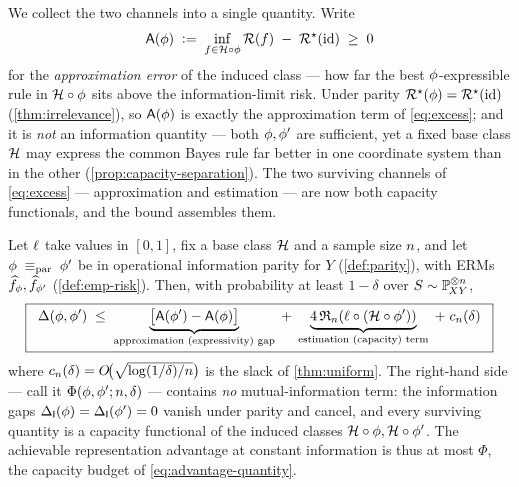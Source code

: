 We collect the two channels into a single quantity. Write
\begin{equation}
  \label{eq:approxerr}
  \mathsf{A}(\phi) \;\vcentcolon=\; \inf_{f\in\mathcal{H}\circ\phi}\mathcal{R}(f)
    \;-\; \mathcal{R}^{\star}(\mathrm{id}) \;\ge\; 0
\end{equation}
for the \emph{approximation error} of the induced class --- how far the best
$\phi$-expressible rule in $\mathcal{H}\circ\phi$ sits above the information-limit
risk. Under parity $\mathcal{R}^{\star}(\phi)=\mathcal{R}^{\star}(\mathrm{id})$
(\cref{thm:irrelevance}), so $\mathsf{A}(\phi)$ is exactly the approximation
term of \eqref{eq:excess}; and it is \emph{not} an information quantity --- both
$\phi,\phi'$ are sufficient, yet a fixed base class $\mathcal{H}$ may express the
common Bayes rule far better in one coordinate system than in the other
(\cref{prop:capacity-separation}). The two surviving channels of
\eqref{eq:excess} --- approximation and estimation --- are now both capacity
functionals, and the bound assembles them.

\begin{theorem}
\label{thm:bounded-gap}
Let $\ell$ take values in $[0,1]$, fix a base class $\mathcal{H}$ and a sample
size $n$, and let $\phi \;\equiv_{\mathrm{par}}\; \phi'$ be in operational information
parity for $Y$ (\cref{def:parity}), with ERMs
$\widehat f_{\phi},\widehat f_{\phi'}$ (\cref{def:emp-risk}). Then, with
probability at least $1-\delta$ over $S\sim\mathbb{P}_{\!XY}^{\otimes n}$,
\begin{equation}
  \label{eq:bounded-gap}
  \boxed{\;\;
  \Delta(\phi,\phi')
  \;\le\;
  \underbrace{\big[\mathsf{A}(\phi')-\mathsf{A}(\phi)\big]}_{\text{approximation (expressivity) gap}}
  \;+\;
  \underbrace{4\,\mathfrak{R}_n(\ell\circ(\mathcal{H}\circ\phi'))}_{\text{estimation (capacity) term}}
  \;+\;
  c_n(\delta)
  \;\;}
\end{equation}
where $c_n(\delta)=O\!\big(\sqrt{\log(1/\delta)/n}\big)$ is the
slack of \cref{thm:uniform}. The right-hand side --- call it
$\Phi(\phi,\phi';n,\delta)$ --- contains \emph{no} mutual-information
term: the information gaps $\Delta_{\mathsf{I}}\!\left(\phi\right)=\Delta_{\mathsf{I}}\!\left(\phi'\right)=0$ vanish under parity
and cancel, and every surviving quantity is a capacity functional of the induced
classes $\mathcal{H}\circ\phi,\mathcal{H}\circ\phi'$. The achievable representation
advantage at constant information is thus at most $\Phi$, the capacity budget of
\eqref{eq:advantage-quantity}.
\end{theorem}

